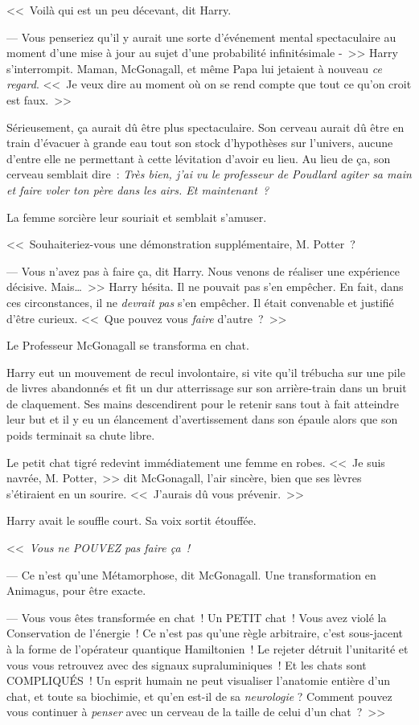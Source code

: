 <<~Voilà qui est un peu décevant, dit Harry.

--- Vous penseriez qu'il y aurait une sorte d'événement mental spectaculaire au moment d'une mise à jour au sujet d'une probabilité infinitésimale -~>> Harry s'interrompit. Maman, McGonagall, et même Papa lui jetaient à nouveau \emph{ce regard}. <<~Je veux dire au moment où on se rend compte que tout ce qu'on croit est faux.~>>

Sérieusement, ça aurait dû être plus spectaculaire. Son cerveau aurait dû être en train d'évacuer à grande eau tout son stock d'hypothèses sur l'univers, aucune d'entre elle ne permettant à cette lévitation d'avoir eu lieu. Au lieu de ça, son cerveau semblait dire~: \emph{Très bien, j'ai vu le professeur de Poudlard agiter sa main et faire voler ton père dans les airs. Et maintenant~?}

La femme sorcière leur souriait et semblait s'amuser.

<<~Souhaiteriez-vous une démonstration supplémentaire, M. Potter~?

--- Vous n'avez pas à faire ça, dit Harry. Nous venons de réaliser une expérience décisive. Mais…~>> Harry hésita. Il ne pouvait pas s'en empêcher. En fait, dans ces circonstances, il ne \emph{devrait pas} s'en empêcher. Il était convenable et justifié d'être curieux. <<~Que pouvez vous \emph{faire} d'autre~?~>>

Le Professeur McGonagall se transforma en chat.

Harry eut un mouvement de recul involontaire, si vite qu'il trébucha sur une pile de livres abandonnés et fit un dur atterrissage sur son arrière-train dans un bruit de claquement. Ses mains descendirent pour le retenir sans tout à fait atteindre leur but et il y eu un élancement d'avertissement dans son épaule alors que son poids terminait sa chute libre.

Le petit chat tigré redevint immédiatement une femme en robes. <<~Je suis navrée, M. Potter,~>> dit McGonagall, l'air sincère, bien que ses lèvres s'étiraient en un sourire. <<~J'aurais dû vous prévenir.~>>

Harry avait le souffle court. Sa voix sortit étouffée.

<<~\emph{Vous ne POUVEZ pas faire ça~!}

--- Ce n'est qu'une Métamorphose, dit McGonagall. Une transformation en Animagus, pour être exacte.

--- Vous vous êtes transformée en chat~! Un PETIT chat~! Vous avez violé la Conservation de l'énergie~! Ce n'est pas qu'une règle arbitraire, c'est sous-jacent à la forme de l'opérateur quantique Hamiltonien~! Le rejeter détruit l'unitarité et vous vous retrouvez avec des signaux supraluminiques~! Et les chats sont COMPLIQUÉS~! Un esprit humain ne peut visualiser l'anatomie entière d'un chat, et toute sa biochimie, et qu'en est-il de sa \emph{neurologie} ? Comment pouvez vous continuer à \emph{penser} avec un cerveau de la taille de celui d'un chat~?~>>

